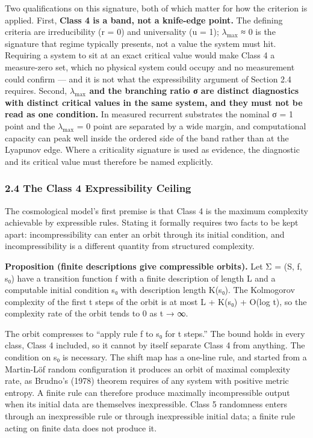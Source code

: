 \documentclass[
]{article}
\begin{document}
Two qualifications on this signature, both of which matter for how the
criterion is applied. First, \textbf{Class 4 is a band, not a knife-edge
point.} The defining criteria are irreducibility (r = 0) and
universality (u = 1); \(\lambda_{\max}\) ≈ 0 is the signature that
regime typically presents, not a value the system must hit. Requiring a
system to sit at an exact critical value would make Class 4 a
measure-zero set, which no physical system could occupy and no
measurement could confirm --- and it is not what the expressibility
argument of Section 2.4 requires. Second, \textbf{\(\lambda_{\max}\) and
the branching ratio σ are distinct diagnostics with distinct critical
values in the same system, and they must not be read as one condition.}
In measured recurrent substrates the nominal σ = 1 point and the
\(\lambda_{\max}\) = 0 point are separated by a wide margin, and
computational capacity can peak well inside the ordered side of the band
rather than at the Lyapunov edge. Where a criticality signature is used
as evidence, the diagnostic and its critical value must therefore be
named explicitly.

\hypertarget{the-class-4-expressibility-ceiling}{%
\subsubsection{2.4 The Class 4 Expressibility
Ceiling}\label{the-class-4-expressibility-ceiling}}

The cosmological model's first premise is that Class 4 is the maximum
complexity achievable by expressible rules. Stating it formally requires
two facts to be kept apart: incompressibility can enter an orbit through
its initial condition, and incompressibility is a different quantity
from structured complexity.

\textbf{Proposition (finite descriptions give compressible orbits).} Let
Σ = (S, f, s₀) have a transition function f with a finite description of
length L and a computable initial condition s₀ with description length
K(s₀). The Kolmogorov complexity of the first t steps of the orbit is at
most L + K(s₀) + O(log t), so the complexity rate of the orbit tends to
0 as t → ∞.

The orbit compresses to ``apply rule f to s₀ for t steps.'' The bound
holds in every class, Class 4 included, so it cannot by itself separate
Class 4 from anything. The condition on s₀ is necessary. The shift map
has a one-line rule, and started from a Martin-Löf random configuration
it produces an orbit of maximal complexity rate, as Brudno's (1978)
theorem requires of any system with positive metric entropy. A finite
rule can therefore produce maximally incompressible output when its
initial data are themselves inexpressible. Class 5 randomness enters
through an inexpressible rule or through inexpressible initial data; a
finite rule acting on finite data does not produce it.
\end{document}
